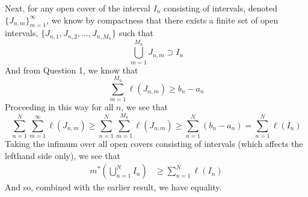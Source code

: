 \documentclass[12pt]{article}
\theoremstyle{plain}
\theoremstyle{definition}
\theoremstyle{remark}
\begin{document}
\begin{enumerate}
Next, for any open cover of the interval $I_n$ consisting of intervals, denoted $\{J_{n,m}\}_{m=1}^\infty$, we know by compactness that there exists a finite set of open intervals, $\{J_{n,1}, J_{n,2}, \ldots,J_{n,M_n}\}$ such that 
\[
    \bigcup^{M_n}_{m=1} J_{n,m} \supset I_n
\]
And from Question 1, we know that 
\begin{equation}
    \sum^{M_n}_{m=1} \ell(J_{n,m}) \geq b_n - a_n
\end{equation}
Proceeding in this way for all $n$, we see that 
\begin{equation}
    \sum^N_{n=1} 
    \sum^{\infty}_{m=1} \ell(J_{n,m}) \geq 
    \sum^N_{n=1} 
    \sum^{M_n}_{m=1} \ell(J_{n,m})
    \geq \sum^N_{n=1} (b_n - a_n)
    =\sum^N_{n=1} \ell\left(I_n\right)
\end{equation}
Taking the infimum over all open covers consisting of intervals (which affects the lefthand side only), we see that 
\begin{align*}
    m^*\left(\bigcup^N_{n=1} I_n\right) &\geq 
    \sum^N_{n=1} \ell(I_n) 
\end{align*}
And so, combined with the earlier result, we have equality.






\end{enumerate}
\end{document}
